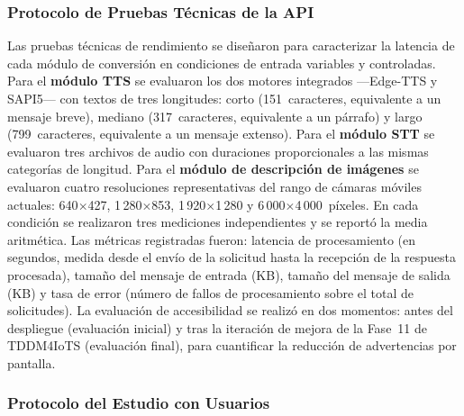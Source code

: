\documentclass[journal]{IEEEtran}
\begin{document}
			\subsubsection{Protocolo de Pruebas T\'ecnicas de la API}
				Las pruebas t\'ecnicas de rendimiento se dise\~naron para caracterizar la latencia de cada m\'odulo de conversi\'on en condiciones de entrada variables y controladas. Para el \textbf{m\'odulo TTS} se evaluaron los dos motores integrados ---Edge-TTS y SAPI5--- con textos de tres longitudes: corto (151~caracteres, equivalente a un mensaje breve), mediano (317~caracteres, equivalente a un p\'arrafo) y largo (799~caracteres, equivalente a un mensaje extenso). Para el \textbf{m\'odulo STT} se evaluaron tres archivos de audio con duraciones proporcionales a las mismas categor\'ias de longitud. Para el \textbf{m\'odulo de descripci\'on de im\'agenes} se evaluaron cuatro resoluciones representativas del rango de c\'amaras m\'oviles actuales: 640$\times$427, 1\,280$\times$853, 1\,920$\times$1\,280 y 6\,000$\times$4\,000~p\'ixeles. En cada condici\'on se realizaron tres mediciones independientes y se report\'o la media aritm\'etica. Las m\'etricas registradas fueron: latencia de procesamiento (en segundos, medida desde el env\'io de la solicitud hasta la recepci\'on de la respuesta procesada), tama\~no del mensaje de entrada (KB), tama\~no del mensaje de salida (KB) y tasa de error (n\'umero de fallos de procesamiento sobre el total de solicitudes). La evaluaci\'on de accesibilidad se realiz\'o en dos momentos: antes del despliegue (evaluaci\'on inicial) y tras la iteraci\'on de mejora de la Fase~11 de TDDM4IoTS (evaluaci\'on final), para cuantificar la reducci\'on de advertencias por pantalla.
				
			\subsubsection{Protocolo del Estudio con Usuarios}
\end{document}
